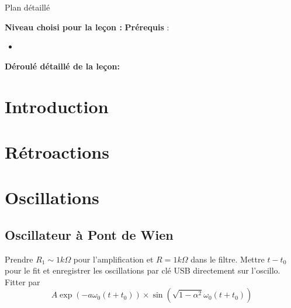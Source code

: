 \begin{reportBlock}{Plan détaillé}

  \textbf{Niveau choisi pour la leçon :} 
  \newline
  \textbf{Prérequis} : \begin{itemize}
      \item 
  \end{itemize}

  \textbf{Déroulé détaillé de la leçon: }  
  
  \section*{Introduction}

  \section{Rétroactions}

  \section{Oscillations}
\subsection{Oscillateur à Pont de Wien}
Prendre $R_1\sim 1k\Omega$ pour l'amplification et $R=1k\Omega$ dans le filtre. Mettre $t-t_0$ pour le fit et enregistrer les oscillations par clé USB directement sur l'oscillo. Fitter par 
\begin{equation}
    A\exp\left(-a\omega_0(t+t_0)\right)\times\sin\left(\sqrt{1-\alpha^2}\omega_0(t+t_0)\right)
\end{equation}


\end{reportBlock}